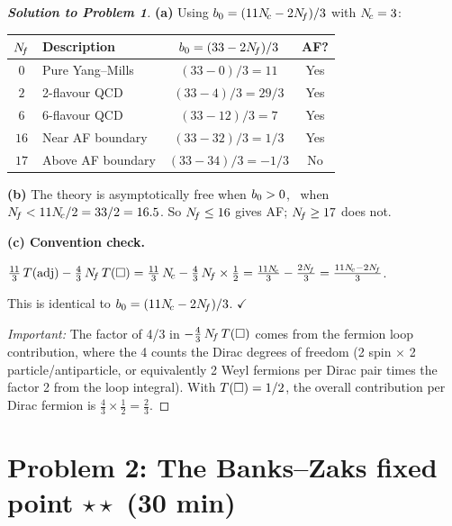 \documentclass[11pt,a4paper]{article}
\begin{document}
\begin{proof}[\textbf{Solution to Problem 1}]

\textbf{(a)} Using $b_0 = (11N_{\!c} - 2N_{\!f})/3$ with $N_{\!c} = 3$:

\begin{center}
\renewcommand{\arraystretch}{1.3}
\begin{tabular}{@{}c l c c@{}}
\toprule
$N_{\!f}$ & Description & $b_0 = (33 - 2N_{\!f})/3$ & AF? \\
\midrule
$0$ & Pure Yang--Mills & $(33-0)/3 = 11$ & Yes \\
$2$ & 2-flavour QCD & $(33-4)/3 = 29/3$ & Yes \\
$6$ & 6-flavour QCD & $(33-12)/3 = 7$ & Yes \\
$16$ & Near AF boundary & $(33-32)/3 = 1/3$ & Yes \\
$17$ & Above AF boundary & $(33-34)/3 = -1/3$ & No \\
\bottomrule
\end{tabular}
\end{center}

\textbf{(b)} The theory is asymptotically free when $b_0 > 0$, \ie\
when $N_{\!f} < 11N_{\!c}/2 = 33/2 = 16.5$.  So $N_{\!f} \leq 16$ gives AF;
$N_{\!f} \geq 17$ does not.

\medskip

\textbf{(c) Convention check.}

$\frac{11}{3}\,T(\mathrm{adj}) - \frac{4}{3}\,N_{\!f}\,T(\square)
= \frac{11}{3}\,N_{\!c} - \frac{4}{3}\,N_{\!f} \times \frac{1}{2}
= \frac{11N_{\!c}}{3} - \frac{2N_{\!f}}{3}
= \frac{11N_{\!c} - 2N_{\!f}}{3}$.

This is identical to $b_0 = (11N_{\!c} - 2N_{\!f})/3$. \quad$\checkmark$

\medskip

\textit{Important:} The factor of 4/3 in $-\frac{4}{3}\,N_{\!f}\,T(\square)$
comes from the fermion loop contribution, where the 4 counts the Dirac
degrees of freedom (2 spin $\times$ 2 particle/antiparticle, or equivalently
2 Weyl fermions per Dirac pair times the factor 2 from the loop integral).
With $T(\square) = 1/2$, the overall contribution per Dirac fermion is
$\frac{4}{3} \times \frac{1}{2} = \frac{2}{3}$.
\end{proof}

\newpage

\section*{Problem 2: The Banks--Zaks fixed point
  \hfill $\star\star$ \normalsize(30 min)}
\label{prob:banks-zaks}
\end{document}
